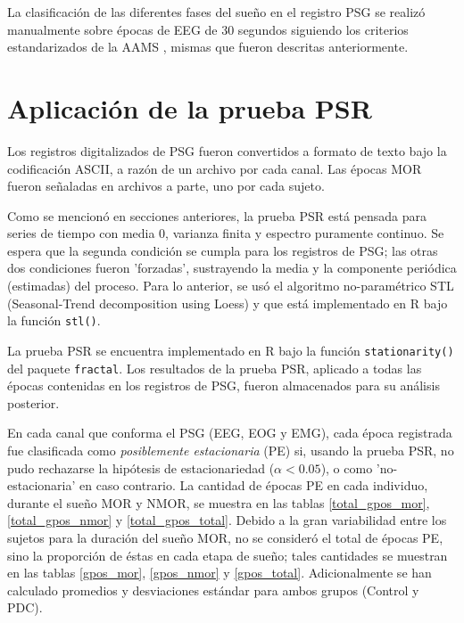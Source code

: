 La clasificación de las diferentes fases del sueño en el registro PSG se realizó manualmente sobre 
épocas de EEG de 30 segundos siguiendo los criterios estandarizados de la AAMS \cite{Hori01}, 
mismas que fueron descritas anteriormente.


\section{Aplicación de la prueba PSR}

Los registros digitalizados de PSG fueron convertidos a formato de texto bajo la codificación 
ASCII, a razón de un archivo por cada canal. 
Las épocas MOR fueron señaladas en archivos a parte, uno por cada sujeto.

Como se mencionó en secciones anteriores, la prueba PSR está pensada para series de tiempo con 
media 0, varianza finita y espectro puramente continuo. Se espera que la segunda condición se 
cumpla para los registros de PSG; las otras dos condiciones fueron 'forzadas', sustrayendo la media 
y la componente periódica (estimadas) del proceso.
Para lo anterior, se usó el algoritmo no-paramétrico STL (Seasonal-Trend decomposition using 
Loess) \cite{Cleveland1990} y que está implementado en R bajo la función \texttt{stl()}.

La prueba PSR se encuentra implementado en R bajo la función \texttt{stationarity()} del paquete 
\texttt{fractal}.
Los resultados de la prueba PSR, aplicado a todas las épocas contenidas en los registros de PSG,
fueron almacenados para su análisis posterior.

En cada canal que conforma el PSG (EEG, EOG y EMG), cada época registrada fue clasificada como 
\textit{posiblemente estacionaria} (PE) si, usando la prueba PSR, no pudo rechazarse la hipótesis de 
estacionariedad ($\alpha < 0.05$), o como 'no-estacionaria' en caso contrario.
La cantidad de épocas PE en cada individuo, durante el sueño MOR y NMOR, se muestra en las 
tablas \ref{total_gpos_mor}, \ref{total_gpos_nmor} y \ref{total_gpos_total}. Debido a la gran 
variabilidad entre los sujetos para la duración del sueño MOR, no se consideró el total de 
épocas PE, sino la proporción de éstas en cada etapa de sueño; tales cantidades se muestran 
en las tablas \ref{gpos_mor}, \ref{gpos_nmor} y \ref{gpos_total}. 
Adicionalmente se han calculado promedios y desviaciones estándar para ambos grupos (Control y 
PDC).

